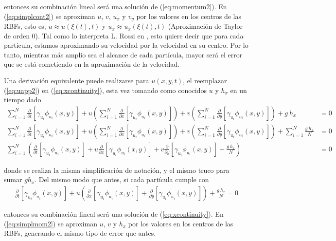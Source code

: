 ﻿\documentclass[spanish]{article}
\begin{document}
      \noindent entonces su combinación lineal será una solución de (\ref{eq:momentum2}). En (\ref{eq:simplcont2}) se aproximan $u$, $v$, $u_x$ y $v_y$ por los valores en los centros de las RBFs, esto es, $u \approx u(\xi(t),t)$ y $u_x \approx u_x(\xi(t),t)$ (Aproximación de Taylor de orden $0$). Tal como lo interpreta L. Rossi en \cite{rossi}, esto quiere decir que para cada partícula, estamos aproximando su velocidad por la velocidad en su centro. Por lo tanto, mientras más amplio sea el alcance de cada partícula, mayor será el error que se está cometiendo en la aproximación de la velocidad.

      Una derivación equivalente puede realizarse para $u(x,y,t)$, el reemplazar (\ref{eq:uapp2}) en (\ref{eq:xcontinuity}), esta vez tomando como conocidos $u$ y $h_x$ en un tiempo dado
      \begin{align*}
      \sum_{i=1}^{N} \frac{\partial}{\partial t}[\gamma_{u_i}\phi_{u_i}(x,y)] + u  \left(\sum_{i=1}^{N}\frac{\partial}{\partial x} [\gamma_{u_i} \phi_{u_i}(x,y)]\right) + v \left(\sum_{i=1}^{N}\frac{\partial}{\partial y} [\gamma_{u_i}\phi_{u_i}(x,y)]\right) + g \ h_x & = 0 \\
      \sum_{i=1}^{N} \frac{\partial}{\partial t}[\gamma_{u_i}\phi_{u_i}(x,y)] + u  \left(\sum_{i=1}^{N}\frac{\partial}{\partial x} [\gamma_{u_i} \phi_{u_i}(x,y)]\right) + v \left(\sum_{i=1}^{N}\frac{\partial}{\partial y} [\gamma_{u_i}\phi_{u_i}(x,y)]\right) + \sum_{i=1}^N \frac{g \ h_x}{N} & = 0 \\
      \sum_{i=1}^{N}\left( \frac{\partial}{\partial t}[\gamma_{u_i}\phi_{u_i}(x,y)] + u \frac{\partial}{\partial x} [\gamma_{u_i} \phi_{u_i}(x,y)] + v \frac{\partial}{\partial y} [\gamma_{u_i} \phi_{u_i}(x,y)] + \frac{g \ h_x}{N} \right) & = 0
      \end{align*}

      \noindent donde se realiza la misma simplificación de notación, y el mismo truco para sumar $g h_x$. Del mismo modo que antes, si cada partícula cumple con  
      \begin{align}
          \frac{\partial}{\partial t}[\gamma_{u_i}\phi_{u_i}(x,y)] + u\left( \frac{\partial}{\partial x} [\gamma_{u_i} \phi_{u_i}(x,y)] +  \frac{\partial}{\partial y} [\gamma_{u_i} \phi_{u_i}(x,y)]\right) + \frac{g \ h_x}{N} = 0
          \label{eq:simplmom2}
      \end{align}

      \noindent entonces su combinación lineal será una solución de  (\ref{eq:xcontinuity}). En (\ref{eq:simplmom2}) se aproximan $u$, $v$ y $h_x$ por los valores en los centros de las RBFs, generando el mismo tipo de error que antes.
      
\end{document}
